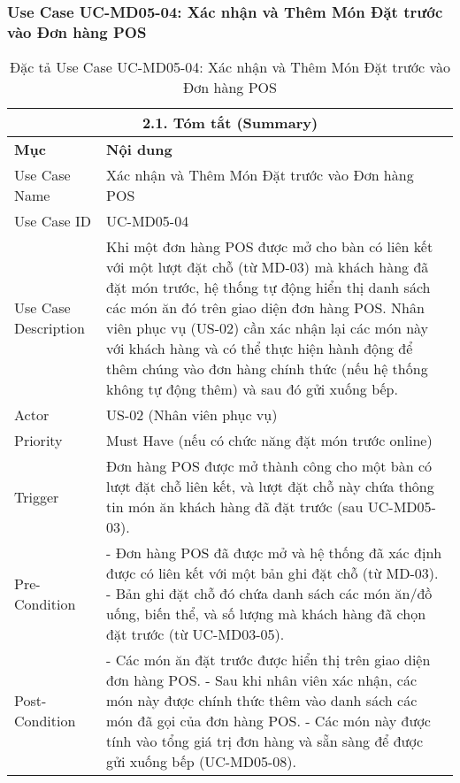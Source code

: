 \subsubsection{Use Case UC-MD05-04: Xác nhận và Thêm Món Đặt trước vào Đơn hàng POS}
\begin{longtable}{|m{4cm}|p{11cm}|}
\caption{Đặc tả Use Case UC-MD05-04: Xác nhận và Thêm Món Đặt trước vào Đơn hàng POS} \label{tab:uc_md05_04_final} \\
\hline
\multicolumn{2}{|c|}{\textbf{2.1. Tóm tắt (Summary)}} \\
\hline
\textbf{Mục} & \textbf{Nội dung} \\
\hline
\endhead %
\hline
\endfoot %
\hline
\endlastfoot %
Use Case Name & Xác nhận và Thêm Món Đặt trước vào Đơn hàng POS \\
\hline
Use Case ID & UC-MD05-04 \\
\hline
Use Case Description & Khi một đơn hàng POS được mở cho bàn có liên kết với một lượt đặt chỗ (từ MD-03) mà khách hàng đã đặt món trước, hệ thống tự động hiển thị danh sách các món ăn đó trên giao diện đơn hàng POS. Nhân viên phục vụ (US-02) cần xác nhận lại các món này với khách hàng và có thể thực hiện hành động để thêm chúng vào đơn hàng chính thức (nếu hệ thống không tự động thêm) và sau đó gửi xuống bếp. \\
\hline
Actor & US-02 (Nhân viên phục vụ) \\
\hline
Priority & Must Have (nếu có chức năng đặt món trước online) \\
\hline
Trigger & Đơn hàng POS được mở thành công cho một bàn có lượt đặt chỗ liên kết, và lượt đặt chỗ này chứa thông tin món ăn khách hàng đã đặt trước (sau UC-MD05-03). \\
\hline
Pre-Condition & - Đơn hàng POS đã được mở và hệ thống đã xác định được có liên kết với một bản ghi đặt chỗ (từ MD-03). \newline - Bản ghi đặt chỗ đó chứa danh sách các món ăn/đồ uống, biến thể, và số lượng mà khách hàng đã chọn đặt trước (từ UC-MD03-05). \\
\hline
Post-Condition & - Các món ăn đặt trước được hiển thị trên giao diện đơn hàng POS. \newline - Sau khi nhân viên xác nhận, các món này được chính thức thêm vào danh sách các món đã gọi của đơn hàng POS. \newline - Các món này được tính vào tổng giá trị đơn hàng và sẵn sàng để được gửi xuống bếp (UC-MD05-08). \\

\end{longtable}
